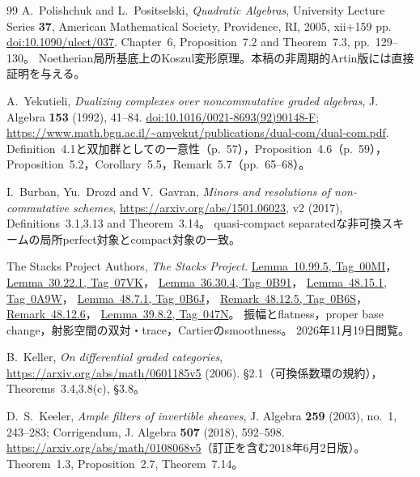 \documentclass[11pt,a4paper]{ltjsarticle}
\numberwithin{equation}{section}
\begin{document}
\begin{thebibliography}{99}
A.~Polishchuk and L.~Positselski,
\emph{Quadratic Algebras}, University Lecture Series \textbf{37},
American Mathematical Society, Providence, RI, 2005, xii+159 pp.
\href{https://doi.org/10.1090/ulect/037}{doi:10.1090/ulect/037}.
Chapter~6, Proposition~7.2 and Theorem~7.3, pp.~129--130。
Noetherian局所基底上のKoszul変形原理。本稿の非周期的Artin版には直接証明を与える。


A.~Yekutieli,
\emph{Dualizing complexes over noncommutative graded algebras},
J. Algebra \textbf{153} (1992), 41--84.
\href{https://doi.org/10.1016/0021-8693(92)90148-F}{doi:10.1016/0021-8693(92)90148-F};
\url{https://www.math.bgu.ac.il/~amyekut/publications/dual-com/dual-com.pdf}.
Definition~4.1と双加群としての一意性（p.~57），Proposition~4.6（p.~59），
Proposition~5.2，Corollary~5.5，Remark~5.7（pp.~65--68）。

I.~Burban, Yu.~Drozd and V.~Gavran,
\emph{Minors and resolutions of non-commutative schemes},
\url{https://arxiv.org/abs/1501.06023}, v2 (2017),
Definitions~3.1,3.13 and Theorem~3.14。
quasi-compact separatedな非可換スキームの局所perfect対象とcompact対象の一致。

The Stacks Project Authors, \emph{The Stacks Project}.
\href{https://stacks.math.columbia.edu/tag/00MI}{Lemma~10.99.5, Tag~00MI}，
\href{https://stacks.math.columbia.edu/tag/07VK}{Lemma~30.22.1, Tag~07VK}，
\href{https://stacks.math.columbia.edu/tag/0B91}{Lemma~36.30.4, Tag~0B91}，
\href{https://stacks.math.columbia.edu/tag/0A9W}{Lemma~48.15.1, Tag~0A9W}，
\href{https://stacks.math.columbia.edu/tag/0B6J}{Lemma~48.7.1, Tag~0B6J}，
\href{https://stacks.math.columbia.edu/tag/0B6S}{Remark~48.12.5, Tag~0B6S}，
\href{https://stacks.math.columbia.edu/tag/0E4H}{Remark~48.12.6}，
\href{https://stacks.math.columbia.edu/tag/047N}{Lemma~39.8.2, Tag~047N}。
振幅とflatness，proper base change，射影空間の双対・trace，Cartierのsmoothness。
2026年11月19日閲覧。

B.~Keller, \emph{On differential graded categories},
\url{https://arxiv.org/abs/math/0601185v5} (2006).
\S2.1（可換係数環の規約），Theorems~3.4,3.8(c), \S3.8。

D.~S.~Keeler, \emph{Ample filters of invertible sheaves},
J. Algebra \textbf{259} (2003), no.~1, 243--283;
Corrigendum, J. Algebra \textbf{507} (2018), 592--598.
\url{https://arxiv.org/abs/math/0108068v5}（訂正を含む2018年6月2日版）。
Theorem~1.3, Proposition~2.7, Theorem~7.14。


\end{thebibliography}
\end{document}
